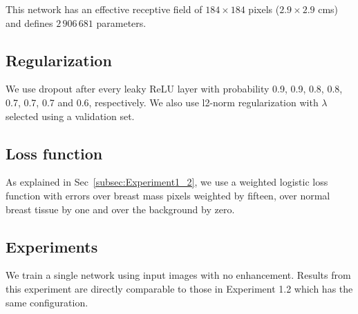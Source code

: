 This network has an effective receptive field of $184 \times 184$ pixels ($2.9 \times 2.9$ cms) and defines $2\,906\,681$ parameters. %

\subsection{Regularization}
We use dropout after every leaky ReLU layer with probability 0.9, 0.9, 0.8, 0.8, 0.7, 0.7, 0.7 and 0.6, respectively. We also use l2-norm regularization with $\lambda$ selected using a validation set.

\subsection{Loss function}
As explained in Sec~\ref{subsec:Experiment1_2}, we use a weighted logistic loss function with errors over breast mass pixels weighted by fifteen, over normal breast tissue by one and over the background by zero.

\subsection{Experiments}
We train a single network using input images with no enhancement. Results from this experiment are directly comparable to those in Experiment 1.2 which has the same configuration.

